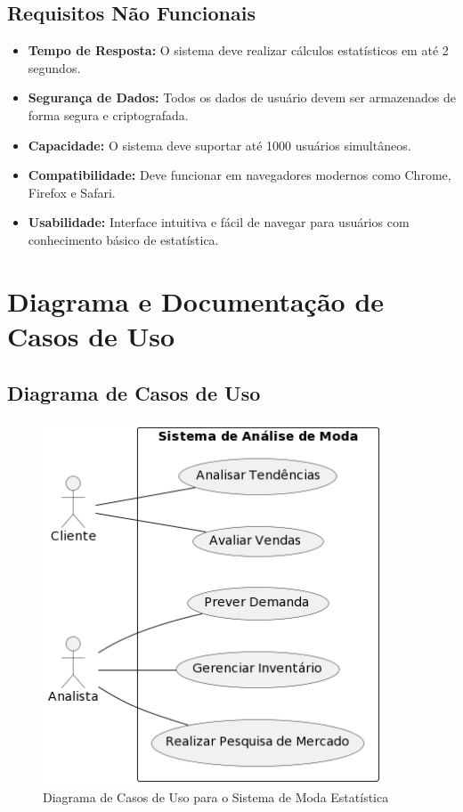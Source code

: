 \documentclass[12pt,a4paper]{article}
\begin{document}
\subsection{Requisitos Não Funcionais}
\begin{itemize}
    \item \textbf{Tempo de Resposta:} O sistema deve realizar cálculos estatísticos em até 2 segundos.
    \item \textbf{Segurança de Dados:} Todos os dados de usuário devem ser armazenados de forma segura e criptografada.
    \item \textbf{Capacidade:} O sistema deve suportar até 1000 usuários simultâneos.
    \item \textbf{Compatibilidade:} Deve funcionar em navegadores modernos como Chrome, Firefox e Safari.
    \item \textbf{Usabilidade:} Interface intuitiva e fácil de navegar para usuários com conhecimento básico de estatística.
\end{itemize}

\newpage
\section{Diagrama e Documentação de Casos de Uso}

\subsection{Diagrama de Casos de Uso}
\begin{figure}[h]
    \centering
    \includegraphics[width=0.9\textwidth]{imagens/casos-de-uso-diagrama.png}
    \caption{Diagrama de Casos de Uso para o Sistema de Moda Estatística}
\end{figure}
\end{document}
